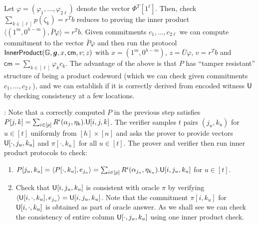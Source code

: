 Let $\varphi=(\varphi_1,\ldots,\varphi_{2\ell})$ denote the vector
$\Phi^T[1^\ell]$. Then, check $\sum_{k\in [\ell]}p(\zeta_k)=r^Tb$ reduces to
proving the inner product $\langle (1^m,0^{h-m}),\bar{P}\varphi\rangle=r^Tb$. Given
commitments $c_1,\ldots,c_{2\ell}$ we can compute commitment to the vector
$\bar{P}\varphi$ and then run the
protocol
$\mathsf{InnerProduct}(\mathbb{G},\bm{g},x, \mathsf{cm},v;z)$ with $x=(1^m, 0^{h-m})$,
$z=\bar{U}\varphi$, $v=r^Tb$ and $\mathsf{cm}=\sum_{k\in [\ell]}\varphi_kc_k$.
The
advantage of the above is that $P$ has ``tamper resistant'' structure of being a
product codeword (which we can check given commitments $c_1,\ldots,c_{2\ell}$),
and we can establish if it is correctly derived from encoded witness $\mathsf{U}$ by
checking consistency at a few locations.\smallskip

: Note that a correctly computed
$P$ in the previous step satisfies $P[j,k]=\sum_{i\in
[p]}R^i(\alpha_j,\eta_k).\mathsf{U}[i,j,k]$. The verifier samples $t$ pairs $(j_u,k_u)$ for $u\in
[t]$ uniformly from $[h]\times [n]$ and asks the prover to provide vectors
$\mathsf{U}[\cdot,j_u,k_u]$ and $\pi[\cdot,k_u]$ for all $u\in [t]$. The prover and
verifier then run inner product protocols to check:
\begin{enumerate}[{\rm (i)}]
\item $P[j_u,k_u]=\langle P[\cdot,k_u], e_{j_u}\rangle=\sum_{i\in
[p]}R^i(\alpha_{j_u},\eta_{k_u}).\mathsf{U}[i,j_u,k_u]$ for $u\in [t]$.
\item Check that $\mathsf{U}[i,j_u,k_u]$ is consistent with oracle $\pi$ by verifying
$\langle \mathsf{U}[i,\cdot,k_u],e_{j_u}\rangle=\mathsf{U}[i,j_u,k_u]$. Note that the commitment
$\pi[i,k_u]$ for $\mathsf{U}[i,\cdot,k_u]$ is obtained as part of oracle answer. As
we shall see we can check the consistency of entire column $\mathsf{U}[\cdot,j_u,k_u]$
using one inner product check.
\end{enumerate}

